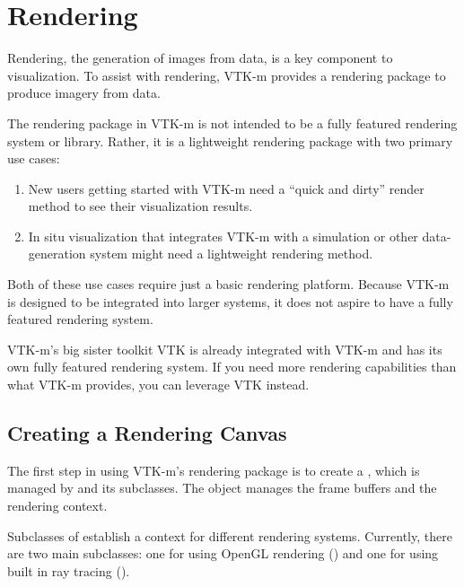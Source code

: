 
\chapter{Rendering}
\label{chap:Rendering}


Rendering, the generation of images from data, is a key component to
visualization. To assist with rendering, VTK-m provides a rendering package
to produce imagery from data.

The rendering package in VTK-m is not intended to be a fully featured
rendering system or library. Rather, it is a lightweight rendering package
with two primary use cases:
\begin{enumerate}
\item New users getting started with VTK-m need a ``quick and dirty''
  render method to see their visualization results.
\item In situ visualization that integrates VTK-m with a simulation or
  other data-generation system might need a lightweight rendering method.
\end{enumerate}

Both of these use cases require just a basic rendering platform. Because
VTK-m is designed to be integrated into larger systems, it does not aspire
to have a fully featured rendering system.

\begin{didyouknow}
  VTK-m's big sister toolkit VTK is already integrated with VTK-m and has
  its own fully featured rendering system. If you need more rendering
  capabilities than what VTK-m provides, you can leverage VTK instead.
\end{didyouknow}

\section{Creating a Rendering Canvas}
\label{sec:Canvas}


The first step in using VTK-m's rendering package is to create a
, which is managed by  and its
subclasses. The  object manages the frame buffers
and the rendering context.

Subclasses of  establish a context for different
rendering systems. Currently, there are two main subclasses: one for using
OpenGL rendering () and one for using built in
ray tracing ().

